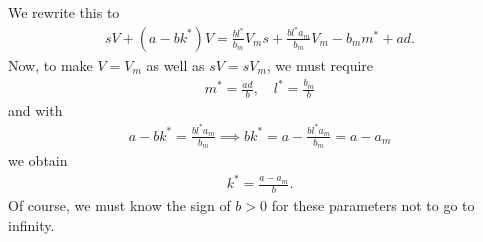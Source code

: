 \documentclass[]{article}
\begin{document}
We rewrite this to
\begin{equation}\begin{aligned}
sV + (a-bk^*)V = \frac{bl^*}{b_m}V_ms + \frac{bl^*a_m}{b_m}V_m - b_m m^* + ad.
\end{aligned}\end{equation}
Now, to make $V=V_m$ as well as $sV = sV_m$, we must require
\begin{equation}\begin{aligned}
m^* = \frac{ad}{b}, \quad l^* = \frac{b_m}{b}
\end{aligned}\end{equation}
and with
\begin{equation}\begin{aligned}
a - bk^* = \frac{bl^* a_m}{b_m} \implies bk^* = a - \frac{bl^* a_m}{b_m} = a-a_m
\end{aligned}\end{equation}
we obtain
\begin{equation}\begin{aligned}
k^* = \frac{a-a_m}{b}.
\end{aligned}\end{equation}
Of course, we must know the sign of $b > 0$ for these parameters not to go to infinity.
\end{document}
